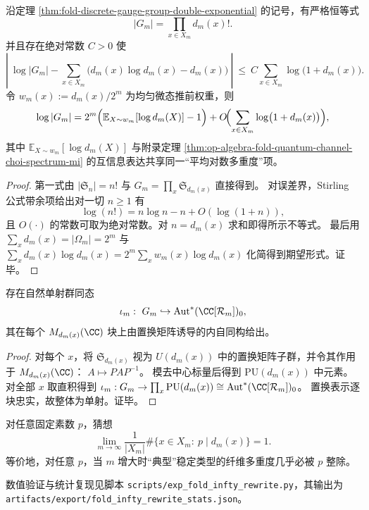 \begin{corollary}\label{cor:fold-discrete-gauge-group-stirling-coupling}
沿定理 \ref{thm:fold-discrete-gauge-group-double-exponential} 的记号，有严格恒等式
\[
|G_m|=\prod_{x\in X_m} d_m(x)! .
\]
并且存在绝对常数 \(C>0\) 使
\[
\left|\ \log|G_m|-\sum_{x\in X_m}\bigl(d_m(x)\log d_m(x)-d_m(x)\bigr)\ \right|
\ \le\ C\sum_{x\in X_m}\log\bigl(1+d_m(x)\bigr).
\]
令 \(w_m(x):=d_m(x)/2^m\) 为均匀微态推前权重，则
\[
\log|G_m|
=2^m\Bigl(\mathbb{E}_{X\sim w_m}[\log d_m(X)]-1\Bigr)
+O\!\Bigl(\sum_{x\in X_m}\log\bigl(1+d_m(x)\bigr)\Bigr),
\]
其中 \(\mathbb{E}_{X\sim w_m}[\log d_m(X)]\) 与附录定理 \ref{thm:op-algebra-fold-quantum-channel-choi-spectrum-mi} 的互信息表达共享同一“平均对数多重度”项。
\end{corollary}
\begin{proof}
第一式由 \(|\mathfrak S_n|=n!\) 与 \(G_m=\prod_x\mathfrak S_{d_m(x)}\) 直接得到。
对误差界，Stirling 公式带余项给出对一切 \(n\ge 1\) 有
\[
\log(n!)=n\log n-n+O(\log(1+n)),
\]
且 \(O(\cdot)\) 的常数可取为绝对常数。对 \(n=d_m(x)\) 求和即得所示不等式。
最后用 \(\sum_x d_m(x)=|\Omega_m|=2^m\) 与
\(
\sum_x d_m(x)\log d_m(x)=2^m\sum_x w_m(x)\log d_m(x)
\)
化简得到期望形式。证毕。
\end{proof}

\begin{proposition}[离散规范群到连续规范群的自然嵌入]\label{prop:fold-discrete-to-continuous-gauge-embedding}
存在自然单射群同态
\[
\iota_m:\ G_m\hookrightarrow \mathrm{Aut}^{\ast}(\CC[\mathcal{R}_m])_0,
\]
其在每个 \(M_{d_m(x)}(\CC)\) 块上由置换矩阵诱导的内自同构给出。
\end{proposition}
\begin{proof}
对每个 \(x\)，将 \(\mathfrak S_{d_m(x)}\) 视为 \(U(d_m(x))\) 中的置换矩阵子群，并令其作用于 \(M_{d_m(x)}(\CC)\)：
\(
A\mapsto PAP^{-1}
\)。
模去中心标量后得到 \(\mathrm{PU}(d_m(x))\) 中元素。
对全部 \(x\) 取直积得到 \(\iota_m:G_m\to \prod_x\mathrm{PU}(d_m(x))\cong \mathrm{Aut}^{\ast}(\CC[\mathcal{R}_m])_0\)。
置换表示逐块忠实，故整体为单射。证毕。
\end{proof}

\begin{conjecture}[素数整除在典型纤维中的几乎必然性]\label{conj:fold-typical-fiber-divisible-by-p}
对任意固定素数 \(p\)，猜想
\[
\lim_{m\to\infty}\frac1{|X_m|}\#\{x\in X_m:\ p\mid d_m(x)\}=1.
\]
等价地，对任意 \(p\)，当 \(m\) 增大时“典型”稳定类型的纤维多重度几乎必被 \(p\) 整除。
\end{conjecture}

数值验证与统计复现见脚本 \texttt{scripts/exp\_fold\_infty\_rewrite.py}，其输出为
\texttt{artifacts/export/fold\_infty\_rewrite\_stats.json}。
